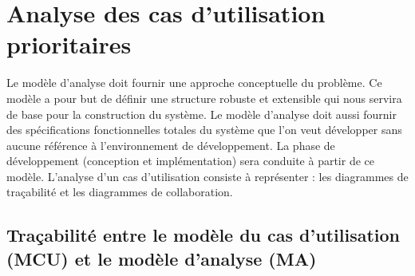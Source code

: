 \documentclass[12 pt ]{report}
\begin{document}
\section{Analyse des cas d’utilisation prioritaires }
Le modèle d’analyse doit fournir une approche conceptuelle du problème. Ce modèle a
pour but de définir une structure robuste et extensible qui nous servira de base pour la
construction du système.
Le modèle d’analyse doit aussi fournir des spécifications fonctionnelles totales du système
que l’on veut développer sans aucune référence à l’environnement de développement. La
phase de développement (conception et implémentation) sera conduite à partir de ce
modèle.
L’analyse d’un cas d’utilisation consiste à représenter : les diagrammes de traçabilité et les
diagrammes de collaboration.

\subsection{Traçabilité entre le modèle du cas d’utilisation (MCU) et le modèle d’analyse (MA)}
\end{document}
